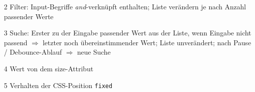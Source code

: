 \begin{table}[!htb]
\begin{adjustbox}{max width=\textwidth}
\begin{threeparttable}
\begin{tablenotes}
                \item[2] Filter: Input-Begriffe \emph{and}-verknüpft enthalten; 
                                Liste verändern je nach Anzahl passender Werte
                \item[3] Suche: Erster zu der Eingabe passender Wert aus der Liste, wenn Eingabe nicht passend $\Rightarrow$ letzter noch übereinstimmender Wert; 
                                Liste unverändert; nach Pause / Debounce-Ablauf $\Rightarrow$ neue Suche
                \item[4] Wert von dem size-Attribut
                \item[5] Verhalten der CSS-Position \texttt{fixed}
            \end{tablenotes}
        \end{threeparttable}
    \end{adjustbox}
\end{table}

